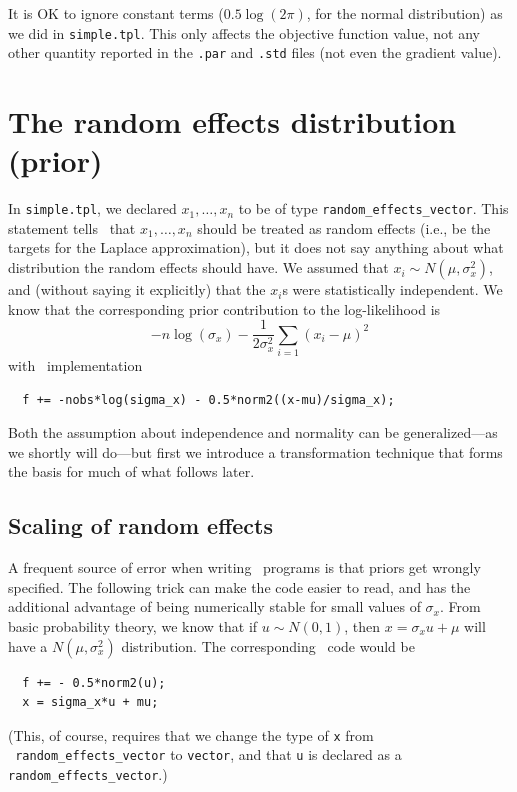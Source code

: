 \documentclass{admbmanual}
\begin{document}
It is OK to ignore constant terms ($0.5\log(2\pi)$, for the normal distribution)
as we did in \texttt{simple.tpl}. This only affects the objective function
value, not any other quantity reported in the \texttt{.par} and \texttt{.std}
files (not even the gradient value).

\section{The random effects distribution (prior)}

In \texttt{simple.tpl}, we declared $x_{1},\ldots ,x_{n}$ to be of type
\texttt{random\_effects\_vector}. This statement tells \scAB\ that $x_{1},\ldots
,x_{n}$ should be treated as random effects (i.e., be the targets for the
Laplace approximation), but it does not say anything about what distribution the
random effects should have. We assumed that $x_i\sim N(\mu ,\sigma_{x}^{2})$,
and (without saying it explicitly) that the $x_i$s were statistically
independent. We know that the corresponding prior contribution to the
log-likelihood is
\[
-n\log (\sigma_{x})-\frac{1}{2\sigma_x^2}\sum_{i=1}\left( x_i-\mu \right) ^{2}
\]
with \scAB\ implementation
\begin{lstlisting}
  f += -nobs*log(sigma_x) - 0.5*norm2((x-mu)/sigma_x);
\end{lstlisting}
Both the assumption about independence and normality can be generalized---as we
shortly will do---but first we introduce a transformation technique that forms
the basis for much of what follows later.

\subsection{Scaling of random effects}

A frequent source of error when writing \scAR\ programs is that priors get
wrongly specified. The following trick can make the code easier to read, and has
the additional advantage of being numerically stable for small values of
$\sigma_{x}$. From basic probability theory, we know that if $u\sim N(0,1)$,
then $x=\sigma_{x}u+\mu$ will have a $N(\mu ,\sigma_{x}^{2})$ distribution. The
corresponding \scAB\ code would be
\begin{lstlisting}
  f += - 0.5*norm2(u);
  x = sigma_x*u + mu;
\end{lstlisting}
(This, of course, requires that we change the type of \texttt{x}
from \texttt{\ random\_effects\_vector} to \texttt{vector}, and that \texttt{u}
is declared as a \texttt{random\_effects\_vector}.)
\end{document}
